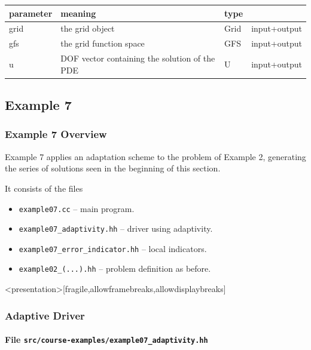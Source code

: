 \begin{tabular}{l|lll}
  parameter   & meaning                                          & type    &  \\
  \hline
  grid        & the grid object                                  & Grid    & input+output \\
  gfs         & the grid function space                          & GFS     & input+output \\
  u           & DOF vector containing the solution of the PDE    & U       & input+output \\
\end{tabular}




\subsection{Example 7}

\begin{frame}
  \frametitle{Example 7 Overview}

  Example 7 applies an adaptation scheme to the problem of Example 2, generating the series of solutions seen in the beginning of this section.

  It consists of the files
  \begin{itemize}
    \item \lstinline{example07.cc} -- main program.
    \item \lstinline{example07_adaptivity.hh} -- driver using adaptivity.
    \item \lstinline{example07_error_indicator.hh} -- local indicators.
    \item \lstinline{example02_(...).hh} -- problem definition as before.
  \end{itemize}
\end{frame}

\begin{frame}<presentation>[fragile,allowframebreaks,allowdisplaybreaks]
  \frametitle<presentation>{Adaptive Driver}
  \framesubtitle<presentation>{File \texttt{src/course-examples/example07\_adaptivity.hh}}
  
\end{frame}


